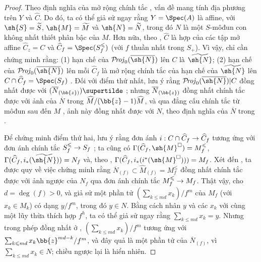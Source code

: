 \documentclass[oneside,10pt]{amsart}
\makeatletter
\renewcommand{\leq}{\leqslant}
\newcommand{\ega@arrow}[2]{\mathchoice{#1}{#2}{#2}{#2}}
\renewcommand{\to}{\ega@arrow{\longrightarrow}{\rightarrow}}
\def\shProj{\mathcal{P}\!\mathit{roj}}
\makeatother
\begin{document}
\begin{proof}
Theo định nghĩa của mở rộng chính tắc , vấn đề mang tính địa phương trên $Y$ và $\widehat{C}$.
Do đó, ta có thể giả sử ngay rằng $Y=\Spec(A)$ là affine, với $\sh{S}=\widetilde{S}$, $\sh{M}=\widetilde{M}$ và $\sh{N}=\widetilde{N}$, trong đó $N$ là một $S$-môđun con không nhất thiết phân bậc của $M$.
Hơn nữa, theo , $\widehat{C}$ là hợp của các tập mở affine $\widehat{C}_z=C$ và $\widehat{C}_f=\Spec(S_f^\leq)$ (với $f$ thuần nhất trong $S_+$).
Vì vậy, chỉ cần chứng minh rằng: (1) hạn chế của $\shProj_0(\overline{\sh{N}})$ lên $C$ là $\widetilde{\sh{N}}$; (2) hạn chế của $\shProj_0(\overline{\sh{N}})$ lên mỗi $\widehat{C}_f$ là mở rộng chính tắc của hạn chế của $\widetilde{\sh{N}}$ lên $C\cap\widehat{C}_f=\Spec(S_f)$ .
Đối với điểm thứ nhất, lưu ý rằng $\shProj_0(\overline{\sh{N}})|C$ đồng nhất được với $(\overline{N}_{(\bb{z})})\supertilde$ ;
nhưng $\overline{N}_{(\bb{z})}$ đồng nhất chính tắc được  với ảnh của $\overline{N}$ trong $\widehat{M}/(\bb{z}-1)\widehat{M}$, và qua đẳng cấu chính tắc từ môđun sau đến $M$ , ảnh này đồng nhất được với $N$, theo định nghĩa của $\overline{N}$ trong .

Để chứng minh điểm thứ hai, lưu ý rằng đơn ánh $i:C\cap\widehat{C}_f\to\widehat{C}_f$ tương ứng với đơn ánh chính tắc $S_f^\leq\to S_f$ ;
ta cũng có $\Gamma(\widehat{C}_f,\sh{M}^\square)=M_f^\leq$, $\Gamma(\widehat{C}_f,i_*(\widetilde{\sh{N}}))=N_f$ và, theo , $\Gamma(\widehat{C}_f,i_*(i^*(\sh{M}^\square)))=M_f$.
Xét đến , ta được quy về việc chứng minh rằng $\overline{N}_{(f)}\subset\widehat{M}_{(f)}=M_f^\leq$ đồng nhất chính tắc được với ảnh ngược của $N_f$ qua đơn ánh chính tắc $M_f^\leq\to M_f$.
Thật vậy, cho $d=\deg(f)>0$, và giả sử một phần tử $(\sum_{k\leq md}x_k)/f^m$ của $M_f$ (với $x_k\in M_k$) có dạng $y/f^m$, trong đó $y\in N$.
Bằng cách nhân $y$ và các $x_k$ với cùng một lũy thừa thích hợp $f^h$, ta có thể giả sử ngay rằng $\sum_{k\leq md}x_k=y$.
Nhưng trong phép đồng nhất ở , $(\sum_{k\leq md}x_k)/f^m$ tương ứng với $\sum_{k\leq md}x_k\bb{z}^{md-k}/f^m$, và đây quả là một phần tử của $\overline{N}_{(f)}$, vì $\sum_{k\leq md}x_k\in N$;
chiều ngược lại là hiển nhiên.
\end{proof}
\end{document}
